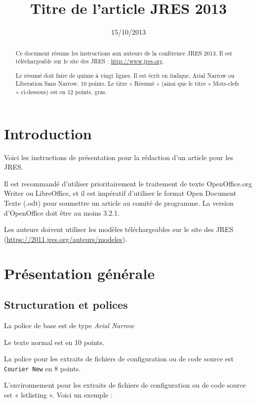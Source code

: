 \documentclass[11pt]{jres}
\title{Titre de l'article JRES 2013}
\date{15/10/2013}
\begin{document}
\maketitle

\begin{abstract}
Ce document résume les instructions aux auteurs de la conférence JRES 2013.
Il est téléchargeable sur le site des JRES : \url{http://www.jres.org}.

Le résumé doit faire de quinze à vingt lignes. Il est écrit en italique, 
Arial Narrow ou Liberation Sans Narrow, 10 points. 
Le titre « Résumé » (ainsi que le titre « Mots-clefs » ci-dessous) 
est en 12 points, gras.
\end{abstract}


\section{Introduction}

Voici les instructions de présentation pour la rédaction d'un article
pour les JRES.  

Il est recommandé d'utiliser prioritairement le
traitement de texte OpenOffice.org Writer ou LibreOffice, et il est
impératif d'utiliser le format Open Document Texte (.odt) pour
soumettre un article au comité de programme. 
La version d'OpenOffice doit être au moins 3.2.1.  

Les auteurs doivent utiliser les modèles téléchargeables sur le site
des JRES (\url{https://2011.jres.org/auteurs/modeles}).

\section{Présentation générale}

\subsection{Structuration et polices}

La police de base est de type \emph{Arial Narrow}

Le texte  normal est en 10 points.

La police pour les extraits de fichiers de configuration ou de code source est \texttt{Courier New} en 8 points.

L'environnement pour les extraits de fichiers de configuration ou 
de code source  est « lstlisting ». Voici un exemple :
\end{document}
